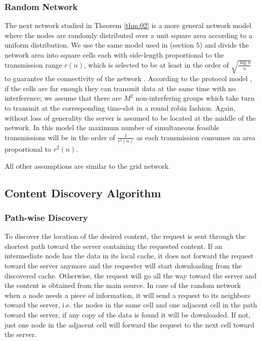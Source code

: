 \documentclass[journal]{IEEEtran}
\theoremstyle{plain}
\theoremstyle{remark}
\begin{document}
\subsubsection{Random Network}

The next network studied in Theorem \ref{thm:02} is a more general network model where the nodes are randomly distributed over a unit square area according to a uniform distribution. We use the same model used in \cite{book06:Xue} (section $5$) and divide the network area into square cells each with side-length proportional to the transmission range $r(n)$, which is selected to be at least in the order of $\sqrt{\frac{\log n}{n}}$ to guarantee the connectivity of the network \cite{Applied97:Penrose}. According to the protocol model \cite{book06:Xue}, if the cells are far enough they can transmit data at the same time with no interference; we assume that there are $M^2$ non-interfering groups which take turn to transmit at the corresponding time-slot in a round robin fashion. Again, without loss of generality the server is assumed to be located at the middle of the network. In this model the maximum number of simultaneous feasible transmissions  will be in the order of $\frac{1}{r^2(n)}$ as each transmission consumes an area proportional to $r^2(n)$.

All other assumptions are similar to the grid network.

\subsection{Content Discovery Algorithm}

\subsubsection{Path-wise Discovery}

To discover the location of the desired content, the request is sent through the shortest path toward the server containing the requested content. If an intermediate node has the data in its local cache, it does not forward the request toward the server anymore and the requester will start downloading from the discovered cache. Otherwise, the request will go all the way toward the server and the content is obtained from the main source. In case of the random network when a node needs a piece of information, it will send a request to its neighbors toward the server, i.e. the nodes in the same cell and one adjacent cell in the path toward the server, if any copy of the data is found it will be downloaded. If not, just one node in the adjacent cell will forward the request to the next cell toward the server.
	
\end{document}

